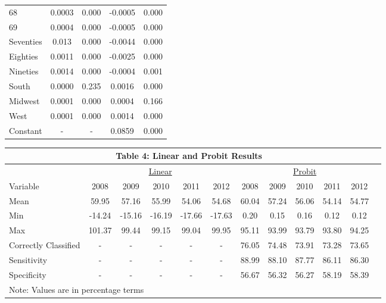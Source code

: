 \documentclass[11pt]{article}
\theoremstyle{definition}
\begin{document}
\begin{center}
\begin{tabular}{l c c c c}
 68  & 0.0003 & 0.000 & -0.0005 & 0.000 \\
 69  & 0.0004 & 0.000 & -0.0005 & 0.000 \\
 Seventies  & 0.013 & 0.000 & -0.0044 & 0.000 \\
 Eighties  & 0.0011 & 0.000 & -0.0025 & 0.000 \\
 Nineties  & 0.0014 & 0.000 & -0.0004 & 0.001 \\
 South  & 0.0000 & 0.235 & 0.0016 & 0.000 \\
 Midwest  & 0.0001 & 0.000 & 0.0004 & 0.166 \\
 West & 0.0001 & 0.000 & 0.0014 & 0.000 \\
 Constant & - & - & 0.0859 & 0.000 \\
\hline\hline
\end{tabular} 
\end{center}

\small{
\vspace{2.5mm}
\noindent
\begin{center}
\begin{tabular}{l c c c c c c c c c c c}
\hline\hline
\multicolumn{11}{c}{\textbf{Table 4: Linear and Probit Results}} \\
\hline
 & \multicolumn{5}{c}{\underline{\hspace{20mm} Linear \hspace{20mm}}} & \multicolumn{5}{c}{\underline{\hspace{20mm} Probit \hspace{20mm}}} \\
 Variable & 2008 & 2009 & 2010 & 2011 & 2012 & 2008 & 2009 & 2010 & 2011 & 2012 \\
\hline
Mean & 59.95 & 57.16 & 55.99 & 54.06 & 54.68 & 60.04 & 57.24 & 56.06 & 54.14 & 54.77 \\
Min & -14.24 & -15.16 & -16.19 & -17.66 & -17.63 & 0.20 & 0.15 & 0.16 & 0.12 & 0.12 \\
Max & 101.37 & 99.44 & 99.15 & 99.04 & 99.95 & 95.11 & 93.99 & 93.79 & 93.80 & 94.25 \\
Correctly Classified & - & - & - & - & - & 76.05  & 74.48 & 73.91 & 73.28 & 73.65 \\
Sensitivity & - & - & - & - & - & 88.99  & 88.10 & 87.77 & 86.11 & 86.30 \\
Specificity & - & - & - & - & - & 56.67  & 56.32 & 56.27 & 58.19 & 58.39 \\
\hline\hline
\multicolumn{11}{l}{Note: Values are in percentage terms}
\end{tabular} 
\end{center}}
\end{document}
